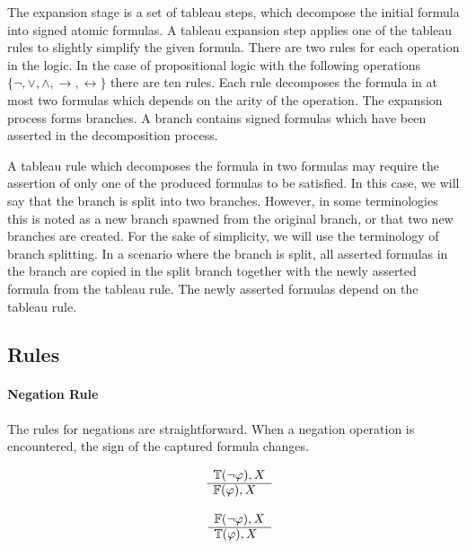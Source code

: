 \documentclass{article}
\newcommand{\signT}{\mathbb{T}}
\newcommand{\signF}{\mathbb{F}}
\begin{document}
The expansion stage is a set of tableau steps, which decompose the initial formula into signed atomic formulas. A tableau expansion step applies one of the tableau rules to slightly simplify the given formula. There are two rules for each operation in the logic. In the case of propositional logic with the following operations $\{ \neg, \vee, \wedge, \rightarrow, \leftrightarrow \}$ there are ten rules. Each rule decomposes the formula in at most two formulas which depends on the arity of the operation. The expansion process forms branches. A branch contains signed formulas which have been asserted in the decomposition process.

A tableau rule which decomposes the formula in two formulas may require the assertion of only one of the produced formulas to be satisfied. In this case, we will say that the branch is split into two branches. However, in some terminologies this is noted as a new branch spawned from the original branch, or that two new branches are created. For the sake of simplicity, we will use the terminology of branch splitting. In a scenario where the branch is split, all asserted formulas in the branch are copied in the split branch together with the newly asserted formula from the tableau rule. The newly asserted formulas depend on the tableau rule.

	\subsection{Rules}
		\paragraph{Negation Rule}
The rules for negations are straightforward. When a negation operation is encountered, the sign of the captured formula changes.
		\newline
		\noindent\begin{minipage}{.5\linewidth}
		\begin{align*}
			\begin{array}{rl}
				& \signT(\neg \varphi), X \\
				      \cline{2-2}
				      & \signF(\varphi), X
			\end{array}
		\end{align*}
		\end{minipage}%
		\begin{minipage}{.5\linewidth}
		\begin{align*}
			\begin{array}{rl}
				& \signF(\neg \varphi), X \\
			      \cline{2-2}
			      & \signT(\varphi), X
			\end{array}
		\end{align*}
		\end{minipage}
		
\end{document}
